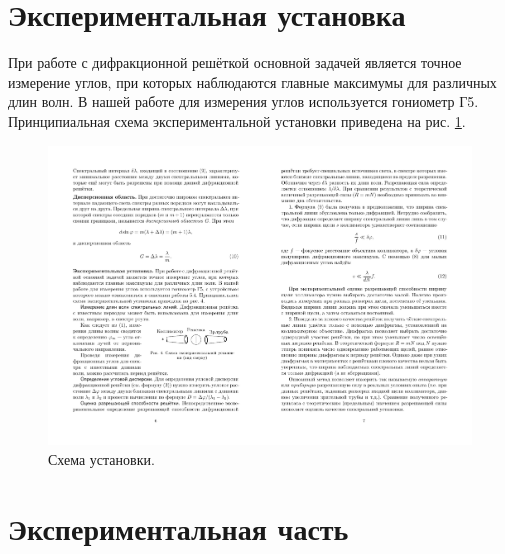 \documentclass[a4paper,12pt]{article} %
\begin{document}
\section{Экспериментальная установка}
	При работе с дифракционной решёткой основной задачей является точное измерение углов, при которых наблюдаются главные максимумы для различных длин волн. В нашей работе для измерения углов используется гониометр Г5. Принципиальная схема экспериментальной установки приведена на рис. \ref{inst}.
	\begin{figure}[H]
		\caption{Схема установки.}
		\label{inst}
		\includegraphics[scale=1.5]{inst.pdf}
	\end{figure}

\newpage
\section{Экспериментальная часть}
\end{document}
